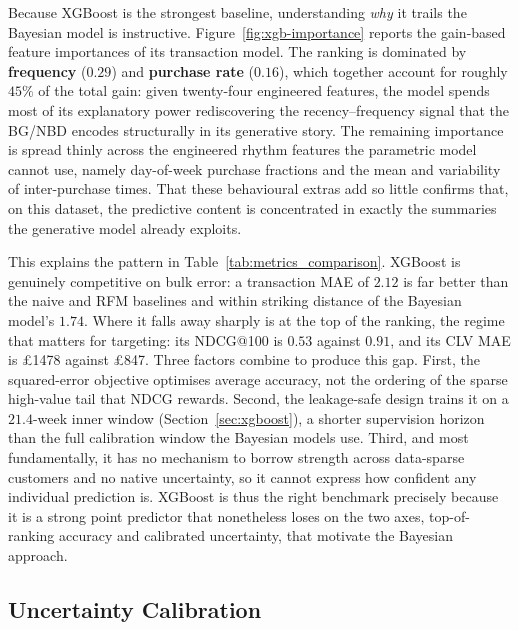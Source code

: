 Because XGBoost is the strongest baseline, understanding \emph{why} it trails the Bayesian model is instructive. Figure~\ref{fig:xgb-importance} reports the gain-based feature importances of its transaction model. The ranking is dominated by \textbf{frequency} ($0.29$) and \textbf{purchase rate} ($0.16$), which together account for roughly $45\%$ of the total gain: given twenty-four engineered features, the model spends most of its explanatory power rediscovering the recency--frequency signal that the BG/NBD encodes structurally in its generative story. The remaining importance is spread thinly across the engineered rhythm features the parametric model cannot use, namely day-of-week purchase fractions and the mean and variability of inter-purchase times. That these behavioural extras add so little confirms that, on this dataset, the predictive content is concentrated in exactly the summaries the generative model already exploits.


This explains the pattern in Table~\ref{tab:metrics_comparison}. XGBoost is genuinely competitive on bulk error: a transaction MAE of $2.12$ is far better than the naive and RFM baselines and within striking distance of the Bayesian model's $1.74$. Where it falls away sharply is at the top of the ranking, the regime that matters for targeting: its NDCG@100 is $0.53$ against $0.91$, and its CLV MAE is \pounds\num{1478} against \pounds\num{847}. Three factors combine to produce this gap. First, the squared-error objective optimises average accuracy, not the ordering of the sparse high-value tail that NDCG rewards. Second, the leakage-safe design trains it on a $21.4$-week inner window (Section~\ref{sec:xgboost}), a shorter supervision horizon than the full calibration window the Bayesian models use. Third, and most fundamentally, it has no mechanism to borrow strength across data-sparse customers and no native uncertainty, so it cannot express how confident any individual prediction is. XGBoost is thus the right benchmark precisely because it is a strong point predictor that nonetheless loses on the two axes, top-of-ranking accuracy and calibrated uncertainty, that motivate the Bayesian approach.

\subsection{Uncertainty Calibration}
\label{sec:results-uncertainty}

